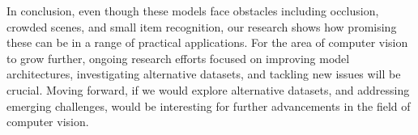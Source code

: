 \documentclass{IEEEtran}
\begin{document}
	In conclusion, even though these models face obstacles including occlusion, crowded scenes, and small item recognition, our research shows how promising these can be in a range of practical applications. For the area of computer vision to grow further, ongoing research efforts focused on improving model architectures, investigating alternative datasets, and tackling new issues will be crucial. Moving forward, if we would explore alternative datasets, and addressing emerging challenges, would be interesting for further advancements in the field of computer vision.
	
	
	
	\nocite{*} %
	
	\printbibliography
	
\end{document}
